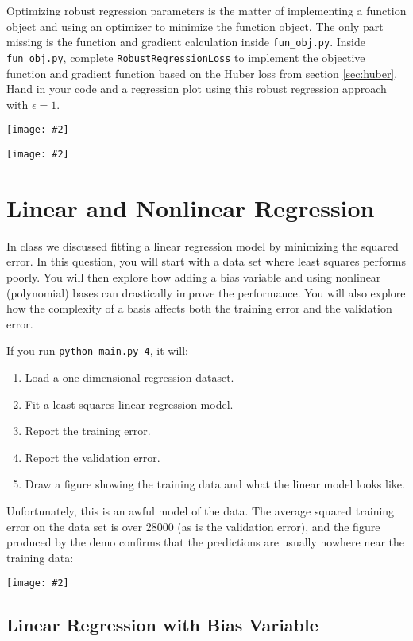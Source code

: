 \documentclass{article}
\newcommand{\blu}[1]{{\textcolor{blu}{#1}}}
\let\ask\blu
\newcommand{\centerfig}[2]{\begin{center}\texttt{[image: \#2]}\end{center}}
\begin{document}
Optimizing robust regression parameters is the matter of implementing a function object and using an optimizer to minimize the function object. The only part missing is the function and gradient calculation inside \texttt{fun\_obj.py}. \ask{Inside \texttt{fun\_obj.py}, complete \texttt{RobustRegressionLoss} to implement the objective function and gradient function based on the Huber loss from section \ref{sec:huber}. Hand in your code and a regression plot using this robust regression approach with $\epsilon=1$.}
\centerfig{0.8}{q3.4.1.png}
\centerfig{0.8}{figs/robust_gd}


\clearpage

\section{Linear and Nonlinear Regression}

In class we discussed fitting a linear regression model by minimizing the squared error.
In this question, you will start with a data set where least squares performs poorly.
You will then explore how adding a bias variable and using nonlinear (polynomial) bases can drastically improve the performance.
You will also explore how the complexity of a basis affects both the training error and the validation error.

If you run \verb|python main.py 4|, it will:
\begin{enumerate}
\item Load a one-dimensional regression dataset.
\item Fit a least-squares linear regression model.
\item Report the training error.
\item Report the validation error.
\item Draw a figure showing the training data and what the linear model looks like.
\end{enumerate}
Unfortunately, this is an awful model of the data. The average squared training error on the data set is over 28000
(as is the validation error), and the figure produced by the demo confirms that the predictions are usually nowhere near
 the training data:
\centerfig{.5}{./figs/least_squares_no_bias.pdf}

\pagebreak

\subsection{Linear Regression with Bias Variable}\label{biasvar}
\end{document}
